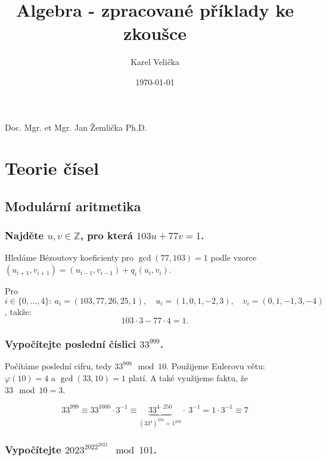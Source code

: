 \documentclass[10pt,a4paper]{article}
\title{Algebra - zpracované příklady ke zkoušce}
\date{\today}
\author{\sc Karel Velička}
\newcommand{\Z}{{\mathbb{Z}}}       %
\begin{document}
\maketitle
\begin{center}
    Doc. Mgr. et Mgr. Jan Žemlička Ph.D.
\end{center}

\tableofcontents
\newpage




\section{Teorie čísel}

\subsection{Modulární aritmetika}

\subsubsection{Najděte $u, v \in \Z$, pro která $103u + 77v = 1$.}

Hledáme Bézoutovy koeficienty pro $\gcd(77, 103) = 1$ podle vzorce $(u_{i+1}, v_{i+1})=(u_{i-1}, v_{i-1})+q_i(u_{i}, v_{i})$.

Pro $i \in \{0, \dots, 4\}: ~a_i = (103, 77, 26, 25, 1), \quad u_i=(1, 0, 1, -2, 3), \quad v_i = (0, 1, -1, 3, -4)$, takže: $$103 \cdot 3 - 77 \cdot 4 = 1.$$

\subsubsection{Vypočítejte poslední číslici $33^{999}$.}

Počítáme poslední cifru, tedy $33^{999} \mod 10$. Použijeme Eulerovu větu: $\varphi(10) = 4$ a $\gcd(33, 10)=1$ platí. A také využijeme faktu, že $33 \mod 10 = 3$.

\[
    33^{999} \equiv 33^{1000} \cdot 3^{-1} \equiv \underbrace{33^{4\cdot 250}}_{(33^4)^{250}=1^{250}} \cdot ~ 3^{-1} = 1 \cdot 3^{-1} \equiv 7
\]


\subsubsection{Vypočítejte $2023^{2022^{2021}} \mod 101$.}
\end{document}
